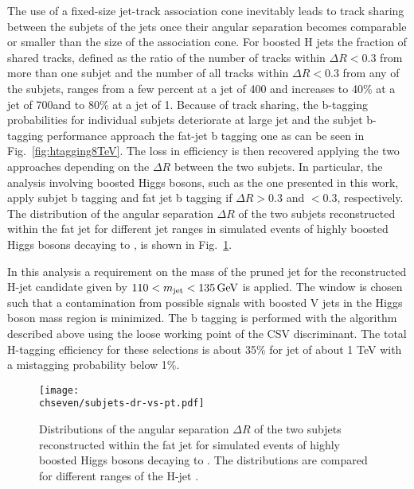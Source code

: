 The use of a fixed-size jet-track association cone inevitably leads to track sharing between the subjets of the jets once their angular separation becomes comparable
or smaller than the size of the association cone. 
For boosted H jets the fraction of shared tracks, defined as the ratio of the number of tracks within $\Delta R < 0.3$
from more than one subjet and the number of all tracks within $\Delta R < 0.3$ from any of the subjets,
ranges from a few percent at a jet \pt of 400\GeV
and increases to 40\% at a jet \pt of 700\GeV and to 80\% at a jet \pt of 1\TeV.
Because of track sharing, the b-tagging probabilities for individual subjets deteriorate at large jet \pt and the subjet b-tagging performance approach the
fat-jet b tagging one as can be seen in Fig.~\ref{fig:htagging8TeV}.
The loss in efficiency is then recovered applying the two approaches depending on the $\Delta R$ between the two subjets.
In particular, the analysis involving boosted Higgs bosons, such as the one presented in this work,
apply subjet b tagging and fat jet b tagging if $\Delta R > 0.3$ and $< 0.3$, respectively. 
The distribution of the angular separation $\Delta R$ of the two subjets reconstructed within the fat jet for different jet \pt ranges 
in simulated events of highly boosted Higgs bosons decaying to \bbbar, is shown in Fig.~\ref{fig:subjetdR}.

In this analysis a requirement on the mass of the pruned jet for the reconstructed H-jet candidate given by $110 < m_{\text{jet}} < 135\,\text{Ge\hspace{-.08em}V}$ is applied. The \mJ window is chosen such that a contamination from possible signals with boosted V jets in the Higgs boson mass region is minimized. The b tagging is performed with the algorithm described above using the loose working point of the CSV discriminant. The total H-tagging efficiency for these selections is about 35\% for jet \pt of about 1 TeV with a mistagging probability below 1\%.

\begin{figure}[!htb]
 \begin{center}
  \texttt{[image: \\chseven/subjets-dr-vs-pt.pdf]}
 \end{center}
 \caption{\small Distributions of the angular separation $\Delta R$ of the two subjets reconstructed within the fat jet for simulated events of highly boosted Higgs bosons decaying to \bbbar. The distributions are compared for different ranges of the H-jet \pt.}
 \label{fig:subjetdR}
\end{figure}


